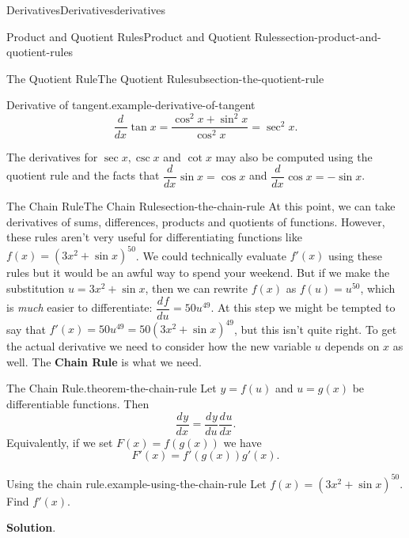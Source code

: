 \documentclass[oneside,10pt,]{book}
\newcommand{\terminology}[1]{\textbf{#1}}
\numberwithin{equation}{section}
\newcommand{\dv}[3][]{\dfrac{d^{#1} #2}{d #3^{#1}}}
\begin{document}
\begin{chapterptx}{Derivatives}{}{Derivatives}{}{}{derivatives}
\begin{sectionptx}{Product and Quotient Rules}{}{Product and Quotient Rules}{}{}{section-product-and-quotient-rules}
\begin{subsectionptx}{The Quotient Rule}{}{The Quotient Rule}{}{}{subsection-the-quotient-rule}
\begin{example}{Derivative of tangent.}{example-derivative-of-tangent}
\begin{equation*}
\dv{}{x}\tan x = \frac{\cos^{2}x + \sin^{2}x}{\cos^{2}x} = \sec^{2}x.
\end{equation*}
%
\end{example}
\hypertarget{p-148}{}%
The derivatives for \(\sec x, \csc x\) and \(\cot x\) may also be computed using the quotient rule and the facts that \(\dv{}{x}\sin x = \cos x\) and \(\dv{}{x}\cos x = -\sin x\).%
\end{subsectionptx}
\end{sectionptx}
%
%
\typeout{************************************************}
\typeout{************************************************}
%
\begin{sectionptx}{The Chain Rule}{}{The Chain Rule}{}{}{section-the-chain-rule}
\hypertarget{p-149}{}%
At this point, we can take derivatives of sums, differences, products and quotients of functions. However, these rules aren't very useful for differentiating functions like \(f(x) = (3x^{2} + \sin x)^{50}\). We could technically evaluate \(f'(x)\) using these rules but it would be an awful way to spend your weekend. But if we make the substitution \(u = 3x^{2} + \sin x\), then we can rewrite \(f(x)\) as \(f(u) = u^{50}\), which is \emph{much} easier to differentiate: \(\dv{f}{u} = 50u^{49}\). At this step we might be tempted to say that \(f'(x) = 50u^{49} = 50(3x^{2} + \sin x)^{49}\), but this isn't quite right. To get the actual derivative we need to consider how the new variable \(u\) depends on \(x\) as well. The \terminology{Chain Rule} is what we need.%
\begin{theorem}{The Chain Rule.}{}{theorem-the-chain-rule}%
\hypertarget{p-150}{}%
Let \(y = f(u)\) and \(u = g(x)\) be differentiable functions. Then%
\begin{equation*}
\dv{y}{x} = \dv{y}{u}\dv{u}{x}.
\end{equation*}
Equivalently, if we set \(F(x) = f(g(x))\) we have%
\begin{equation*}
F'(x) = f'(g(x))g'(x).
\end{equation*}
%
\end{theorem}
\begin{example}{Using the chain rule.}{example-using-the-chain-rule}%
\hypertarget{p-151}{}%
Let \(f(x) = (3x^{2} + \sin x)^{50}\). Find \(f'(x)\).%
\par\smallskip%
\noindent\textbf{Solution}.\hypertarget{solution-30}{}\quad%
\hypertarget{p-152}{}%

\end{example}
\end{sectionptx}
\end{chapterptx}
\end{document}
